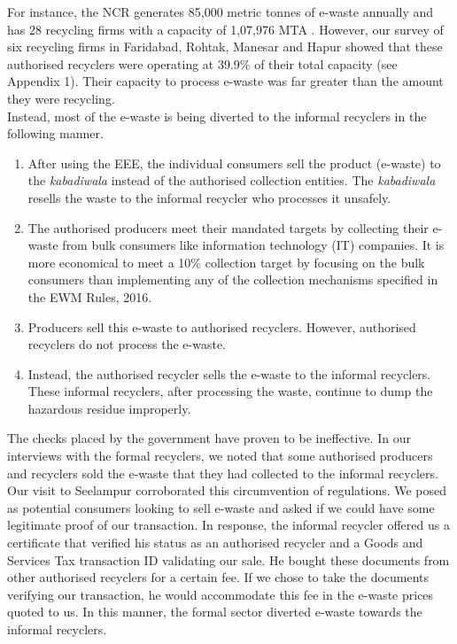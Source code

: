 \documentclass[a4paper, 12pt]{article}
\begin{document}
                    For instance, the NCR generates 85,000 metric tonnes of e-waste annually and has 28 recycling firms with a capacity of 1,07,976 MTA \parencite{assochamdelhi, cpcbrecyclersreport}. However, our survey of six recycling firms in Faridabad, Rohtak, Manesar and Hapur showed that these authorised recyclers were operating at 39.9\% of their total capacity (see Appendix 1). Their capacity to process e-waste was far greater than the amount they were recycling. \\
                    
                    Instead, most of the e-waste is being diverted to the informal recyclers in the following manner.                    
\begin{enumerate}
\item After using the EEE, the individual consumers sell the product (e-waste) to the \textit{kabadiwala} instead of the authorised collection entities. The \textit{kabadiwala} resells the waste to the informal recycler who processes it unsafely. 
\item The authorised producers meet their mandated targets by collecting their e-waste from bulk consumers like information technology (IT) companies. It is more economical to meet a 10\% collection target by focusing on the bulk consumers than implementing any of the collection mechanisms specified in the EWM Rules, 2016.
\item Producers sell this e-waste to authorised recyclers. However, authorised recyclers do not process the e-waste.  
\item Instead, the authorised recycler sells the e-waste to the informal recyclers. These informal recyclers, after processing the waste, continue to dump the hazardous residue improperly.
\end{enumerate}
                    
                    The checks placed by the government have proven to be ineffective. In our interviews with the formal recyclers, we noted that some authorised producers and recyclers sold the e-waste that they had collected to the informal recyclers. \\
                    
                    Our visit to Seelampur corroborated this circumvention of regulations. We posed as potential consumers looking to sell e-waste and asked if we could have some legitimate proof of our transaction. In response, the informal recycler offered us a certificate that verified his status as an authorised recycler and a Goods and Services Tax transaction ID validating our sale. He bought these documents from other authorised recyclers for a certain fee. If we chose to take the documents verifying our transaction, he would accommodate this fee in the e-waste prices quoted to us. In this manner, the formal sector diverted e-waste towards the informal recyclers. \\
                    
\end{document}
